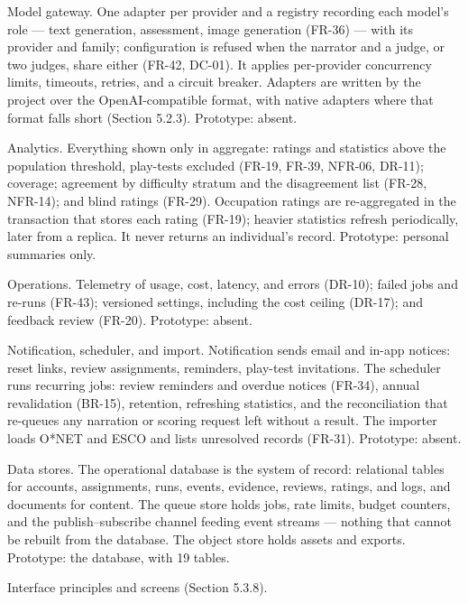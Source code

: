 Model gateway. One adapter per provider and a registry recording each model's role --- text generation, assessment, image generation (FR-36) --- with its provider and family; configuration is refused when the narrator and a judge, or two judges, share either (FR-42, DC-01). It applies per-\allowbreak{}provider concurrency limits, timeouts, retries, and a circuit breaker. Adapters are written by the project over the OpenAI-\allowbreak{}compatible format, with native adapters where that format falls short (Section 5.2.3). Prototype: absent.

Analytics. Everything shown only in aggregate: ratings and statistics above the population threshold, play-tests excluded (FR-19, FR-39, NFR-06, DR-11); coverage; agreement by difficulty stratum and the disagreement list (FR-28, NFR-14); and blind ratings (FR-29). Occupation ratings are re-\allowbreak{}aggregated in the transaction that stores each rating (FR-19); heavier statistics refresh periodically, later from a replica. It never returns an individual's record. Prototype: personal summaries only.

Operations. Telemetry of usage, cost, latency, and errors (DR-10); failed jobs and re-runs (FR-43); versioned settings, including the cost ceiling (DR-17); and feedback review (FR-20). Prototype: absent.

Notification, scheduler, and import. Notification sends email and in-app notices: reset links, review assignments, reminders, play-test invitations. The scheduler runs recurring jobs: review reminders and overdue notices (FR-34), annual revalidation (BR-15), retention, refreshing statistics, and the reconciliation that re-queues any narration or scoring request left without a result. The importer loads O*NET and ESCO and lists unresolved records (FR-31). Prototype: absent.

Data stores. The operational database is the system of record: relational tables for accounts, assignments, runs, events, evidence, reviews, ratings, and logs, and documents for content. The queue store holds jobs, rate limits, budget counters, and the publish--subscribe channel feeding event streams --- nothing that cannot be rebuilt from the database. The object store holds assets and exports. Prototype: the database, with 19 tables.

Interface principles and screens (Section 5.3.8).

